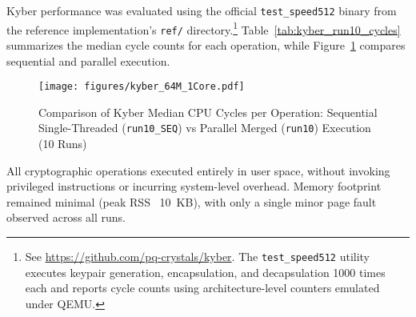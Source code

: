 

Kyber performance was evaluated using the official \texttt{test\_speed512} binary from the reference implementation's \texttt{ref/} directory.\footnote{See \url{https://github.com/pq-crystals/kyber}. The \texttt{test\_speed512} utility executes keypair generation, encapsulation, and decapsulation 1000 times each and reports cycle counts using architecture-level counters emulated under QEMU.} Table~\ref{tab:kyber_run10_cycles} summarizes the median cycle counts for each operation, while Figure~\ref{fig:kyber_native_cycles} compares sequential and parallel execution.


\begin{figure}[htbp]
    \centering
    \texttt{[image: figures/kyber\_64M\_1Core.pdf]}
    \caption{Comparison of Kyber Median CPU Cycles per Operation: Sequential Single-Threaded (\texttt{run10\_SEQ}) vs Parallel Merged (\texttt{run10}) Execution (10 Runs)}
    \label{fig:kyber_native_cycles}
\end{figure}

All cryptographic operations executed entirely in user space, without invoking privileged instructions or incurring system-level overhead. Memory footprint remained minimal (peak RSS ~10~KB), with only a single minor page fault observed across all runs.

